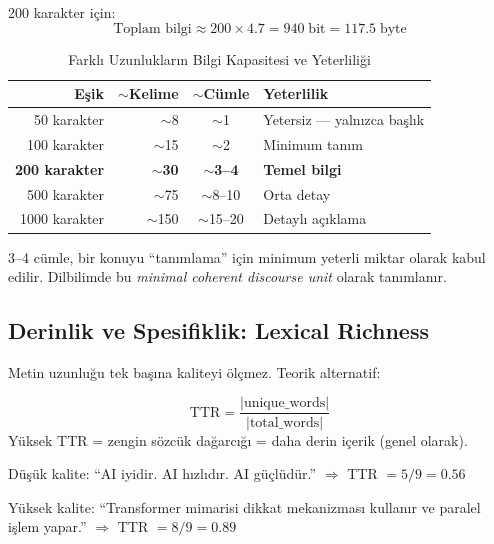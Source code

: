 200 karakter i\c{c}in:
\begin{equation}
\text{Toplam bilgi} \approx 200 \times 4.7 = 940 \;\text{bit} = 117.5 \;\text{byte}
\end{equation}

\begin{table}[H]
\centering
\caption{Farkl{\i} Uzunluklar{\i}n Bilgi Kapasitesi ve Yeterlili\u{g}i}
\label{tab:entropy-thresholds}
\begin{tabular}{rrcl}
\toprule
\color{chapterBlue}\textbf{E\c{s}ik} & \color{chapterBlue}\textbf{$\sim$Kelime} & \color{chapterBlue}\textbf{$\sim$C\"{u}mle} & \color{chapterBlue}\textbf{Yeterlilik} \\
\midrule
50 karakter  & $\sim$8   & $\sim$1     & Yetersiz --- yaln{\i}zca ba\c{s}l{\i}k \\
100 karakter & $\sim$15  & $\sim$2     & Minimum tan{\i}m \\
\textbf{200 karakter} & \textbf{$\sim$30} & \textbf{$\sim$3--4} & \textbf{Temel bilgi} \\
500 karakter & $\sim$75  & $\sim$8--10 & Orta detay \\
1000 karakter & $\sim$150 & $\sim$15--20 & Detayl{\i} a\c{c}{\i}klama \\
\bottomrule
\end{tabular}
\end{table}

3--4 c\"{u}mle, bir konuyu ``tan{\i}mlama'' i\c{c}in minimum yeterli miktar olarak kabul edilir. Dilbilimde bu \emph{minimal coherent discourse unit} olarak tan{\i}mlan{\i}r.

\subsection{Derinlik ve Spesifiklik: Lexical Richness}

Metin uzunlu\u{g}u tek ba\c{s}{\i}na kaliteyi \"{o}l\c{c}mez. Teorik alternatif:

\begin{formulbox}
\begin{equation}
\label{eq:ttr}
\mathrm{TTR} = \frac{|\text{unique\_words}|}{|\text{total\_words}|}
\end{equation}
Y\"{u}ksek TTR = zengin s\"{o}zc\"{u}k da\u{g}arc{\i}\u{g}{\i} = daha derin i\c{c}erik (genel olarak).
\end{formulbox}

\begin{ornek}
D\"{u}\c{s}\"{u}k kalite: ``AI iyidir. AI h{\i}zl{\i}d{\i}r. AI g\"{u}\c{c}l\"{u}d\"{u}r.'' $\Rightarrow$ TTR $= 5/9 = 0.56$

Y\"{u}ksek kalite: ``Transformer mimarisi dikkat mekanizmas{\i} kullan{\i}r ve paralel i\c{s}lem yapar.'' $\Rightarrow$ TTR $= 8/9 = 0.89$
\end{ornek}

